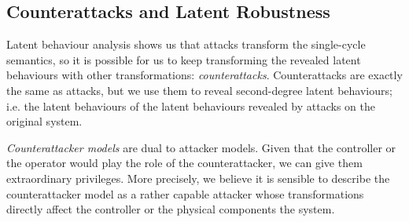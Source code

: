{\subsection{Counterattacks and Latent Robustness}
\label{sec:CounterAttacks}
Latent behaviour analysis shows us that attacks transform the single-cycle semantics, so it is possible for us to keep transforming the revealed latent behaviours with other transformations: \emph{counterattacks}. Counterattacks are exactly the same as attacks, but we use them to reveal second-degree latent behaviours; i.e. the latent behaviours of the latent behaviours revealed by attacks on the original system. 


\emph{Counterattacker models} are dual to attacker models. Given that the controller or the operator would play the role of the counterattacker, we can give them extraordinary privileges. More precisely, we believe it is sensible to describe the counterattacker model as a rather capable attacker whose transformations directly affect the controller or the physical components the system. 

}
